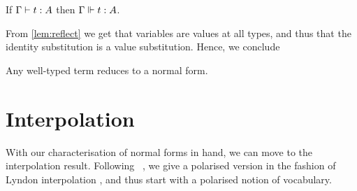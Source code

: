 \documentclass[a4paper,UKenglish,cleveref, autoref, thm-restate]{lipics-v2021}
\begin{document}
\begin{theorem}
  If \(\typing{\Gamma}{t}[A]\) then \(\semty{\Gamma}{t}[A]\).
\end{theorem}

From \cref{lem:reflect} we get that variables are values at all types, and
thus that the identity substitution is a value substitution. Hence, we conclude

\begin{corollary}
  Any well-typed term reduces to a normal form.
\end{corollary}

\section{Interpolation}
\label{sec:interpolation}

With our characterisation of normal forms in hand, we can move to the
interpolation result. Following \Cubric~\cite{Cubric1994}, we give a
polarised version in the fashion of Lyndon interpolation \cite{Lyndon1959interpolation},
and thus start with a polarised notion of vocabulary.
\end{document}
